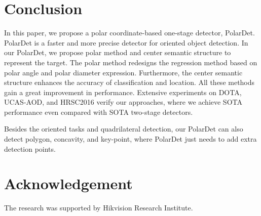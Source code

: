 \documentclass[10pt,twocolumn]{article}
\begin{document}
\section{Conclusion}
In this paper, we propose a polar coordinate-based one-stage detector, PolarDet. PolarDet is a faster and more precise detector for oriented object detection. In our PolarDet, we propose polar method and center semantic structure to represent the target. The polar method redesigns the regression method based on polar angle and polar diameter expression. Furthermore, the center semantic structure enhances the accuracy of classification and location. All these methods gain a great improvement in performance. Extensive experiments on DOTA, UCAS-AOD, and HRSC2016  verify our approaches, where we achieve SOTA performance even compared with SOTA two-stage detectors.

Besides the oriented tasks and quadrilateral detection, our PolarDet can also detect polygon, concavity, and key-point, where PolarDet just needs to add extra detection points.

\section{Acknowledgement}


The research was supported by Hikvision Research Institute.



\end{document}
